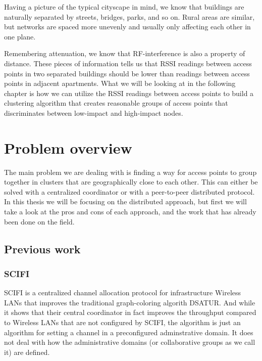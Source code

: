 Having a picture of the typical cityscape in mind, we know that buildings are naturally
separated by streets, bridges, parks, and so on. Rural areas are similar, but networks are spaced more unevenly
and usually only affecting each other in one plane.

Remembering attenuation, we know that RF-interference is also a property of distance. 
These pieces of information tells us that RSSI readings between access points in two separated buildings should be lower than readings between access points in adjacent apartments.
What we will be looking at in the following chapter is how we can utilize the RSSI readings between access points to build a clustering algorithm that creates reasonable groups
of access points that discriminates between low-impact and high-impact nodes.  


\section{Problem overview}
The main problem we are dealing with is finding a way for access points to group together in clusters that are geographically close to each other. This can either be solved with a centralized
coordinator or with a peer-to-peer distributed protocol. In this thesis we will be focusing on the distributed approach, but first we will take a look at the pros and cons of each approach, and
the work that has already been done on the field.
\subsection{Previous work}
\subsubsection{SCIFI} SCIFI \cite{SCIFI} is a centralized channel allocation protocol for infrastructure Wireless LANs that improves the traditional graph-coloring algorith DSATUR. 
And while it shows that their central coordinator in fact improves the throughput compared to Wireless LANs that are not configured by SCIFI, the algorithm is just an algorithm for setting 
a channel in a preconfigured adminstrative domain. It does not deal with how the administrative domains (or collaborative groups as we call it) are defined. 

